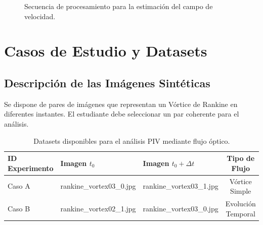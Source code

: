 \documentclass[11pt, a4paper]{article}
\begin{document}
\begin{figure}[htbp]
    \centering
    \caption{Secuencia de procesamiento para la estimación del campo de velocidad.}
\end{figure}

\section{Casos de Estudio y Datasets}

\subsection{Descripción de las Imágenes Sintéticas}
Se dispone de pares de imágenes que representan un Vórtice de Rankine en diferentes instantes. El estudiante debe seleccionar un par coherente para el análisis.

\begin{table}[htbp]
    \centering
    \begin{tabular}{lllc}
        \toprule
        ID Experimento & Imagen $t_0$ & Imagen $t_0 + \Delta t$ & Tipo de Flujo \\
        \midrule
        Caso A & rankine\_vortex03\_0.jpg & rankine\_vortex03\_1.jpg & Vórtice Simple \\
        Caso B & rankine\_vortex02\_1.jpg & rankine\_vortex03\_0.jpg & Evolución Temporal \\
        \bottomrule
    \end{tabular}
    \caption{Datasets disponibles para el análisis PIV mediante flujo óptico.}
\end{table}
\end{document}
